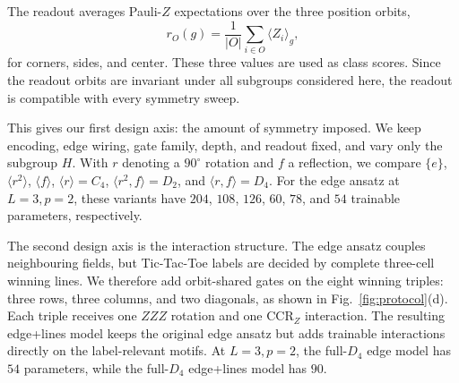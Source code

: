 The readout averages Pauli-$Z$ expectations over the three
position orbits,
\[
r_O(g)=\frac{1}{|O|}\sum_{i\in O}\langle Z_i\rangle_g ,
\]
for corners, sides, and center. These three values are used as
class scores. Since the readout orbits are invariant under all
subgroups considered here, the readout is compatible with every
symmetry sweep.

This gives our first design axis: the amount of symmetry imposed.
We keep encoding, edge wiring, gate family, depth, and readout
fixed, and vary only the subgroup $H$. With $r$ denoting a
$90^\circ$ rotation and $f$ a reflection, we compare
$\{e\}$, $\langle r^2\rangle$, $\langle f\rangle$,
$\langle r\rangle=C_4$, $\langle r^2,f\rangle=D_2$, and
$\langle r,f\rangle=D_4$. For the edge ansatz at $L=3,p=2$,
these variants have $204$, $108$, $126$, $60$, $78$, and $54$
trainable parameters, respectively.

The second design axis is the interaction structure. The edge
ansatz couples neighbouring fields, but Tic-Tac-Toe labels are
decided by complete three-cell winning lines. We therefore add
orbit-shared gates on the eight winning triples: three rows,
three columns, and two diagonals, as shown in
Fig.~\ref{fig:protocol}(d). Each triple receives one $ZZZ$ rotation
and one $\mathrm{CCR}_Z$ interaction. The resulting edge+lines
model keeps the original edge ansatz but adds trainable
interactions directly on the label-relevant motifs. At
$L=3,p=2$, the full-$D_4$ edge model has $54$ parameters, while
the full-$D_4$ edge+lines model has $90$.
